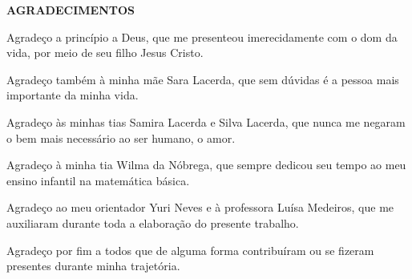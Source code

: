 	\thispagestyle{empty}
	
\onehalfspacing

\begin{center}
	\textbf{AGRADECIMENTOS}
\end{center}

\bigskip

Agradeço a princípio a Deus, que me presenteou imerecidamente com o dom da vida, por meio de seu filho Jesus Cristo. 

Agradeço também à minha mãe Sara Lacerda, que sem dúvidas é a pessoa mais importante da minha vida.

Agradeço às minhas tias Samira Lacerda e Silva Lacerda, que nunca me negaram o bem mais necessário ao ser humano, o amor.

Agradeço à minha tia Wilma da Nóbrega, que sempre dedicou seu tempo ao meu ensino infantil na matemática básica.

Agradeço ao meu orientador Yuri Neves e à professora Luísa Medeiros, que me auxiliaram durante toda a elaboração do presente trabalho.

Agradeço por fim a todos que de alguma forma contribuíram ou se fizeram presentes durante minha trajetória.

\newpage
